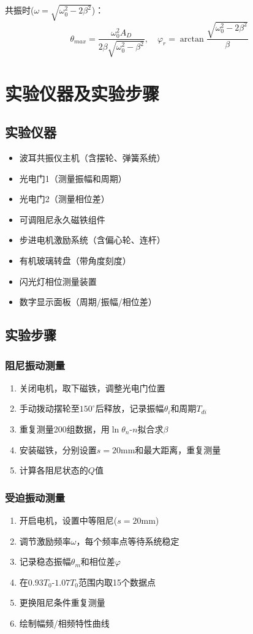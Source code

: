 \documentclass[UTF8]{ctexart}
\begin{document}
共振时($\omega=\sqrt{\omega_0^2-2\beta^2}$)：
\[ \theta_{max} = \frac{\omega_0^2 A_D}{2\beta\sqrt{\omega_0^2-\beta^2}}, \quad \varphi_r = \arctan\frac{\sqrt{\omega_0^2-2\beta^2}}{\beta} \]

\section{实验仪器及实验步骤}
\subsection{实验仪器}
\begin{itemize}
\item 波耳共振仪主机（含摆轮、弹簧系统）
\item 光电门1（测量振幅和周期）
\item 光电门2（测量相位差）
\item 可调阻尼永久磁铁组件
\item 步进电机激励系统（含偏心轮、连杆）
\item 有机玻璃转盘（带角度刻度）
\item 闪光灯相位测量装置
\item 数字显示面板（周期/振幅/相位差）
\end{itemize}

\subsection{实验步骤}
\subsubsection{阻尼振动测量}
\begin{enumerate}
\item 关闭电机，取下磁铁，调整光电门位置
\item 手动拨动摆轮至$150^\circ$后释放，记录振幅$\theta_i$和周期$T_{di}$
\item 重复测量200组数据，用$\ln\theta_n$-$n$拟合求$\beta$
\item 安装磁铁，分别设置$s=20$mm和最大距离，重复测量
\item 计算各阻尼状态的$Q$值
\end{enumerate}

\subsubsection{受迫振动测量}
\begin{enumerate}
\item 开启电机，设置中等阻尼($s=20$mm)
\item 调节激励频率$\omega$，每个频率点等待系统稳定
\item 记录稳态振幅$\theta_m$和相位差$\varphi$
\item 在$0.93T_0$-$1.07T_0$范围内取15个数据点
\item 更换阻尼条件重复测量
\item 绘制幅频/相频特性曲线
\end{enumerate}
\end{document}

